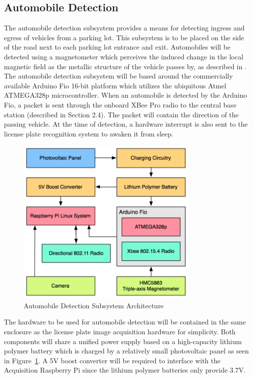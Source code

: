\documentclass[11pt, oneside, fullpage, doublespace]{article}
\begin{document}
\subsection{Automobile Detection}
The automobile detection subsystem provides a means for detecting ingress and egress of vehicles from a parking lot. This subsystem is to be placed on the side of the road next to each parking lot entrance and exit. Automobiles will be detected using a magnetometer which perceives the induced change in the local magnetic field as the metallic structure of the vehicle passes by, as described in \cite{stillwell2013}. The automobile detection subsystem will be based around the commercially available Arduino Fio 16-bit  platform which utilizes the ubiquitous Atmel ATMEGA328p microcontroller. When an automobile is detected by the Arduino Fio, a packet is sent through the onboard XBee Pro radio to the central base station (described in Section 2.4). The packet will  contain the direction of the passing vehicle. At the time of detection,  a hardware interrupt is also sent to the license plate recognition system to awaken it from sleep.

\begin{figure}
\begin{center}
\includegraphics[width=3.5in]{autodetection}
\end{center}
\caption{Automobile Detection Subsystem Architecture}
\label{fig:autodetect}
\end{figure}

The hardware to be used for automobile detection will be contained in the same enclosure as the license plate image acquisition hardware for simplicity. Both components will share a unified power supply based on a high-capacity lithium polymer battery which is charged by a relatively small photovoltaic panel as seen in Figure~\ref{fig:autodetect}. A 5V boost converter will be required to interface with the Acquisition Raspberry Pi since the lithium polymer batteries only provide 3.7V.
\end{document}
